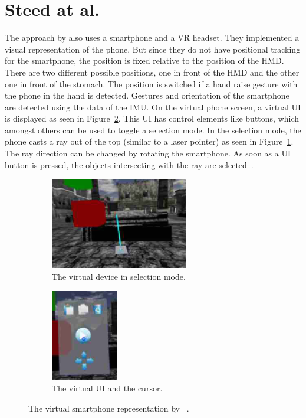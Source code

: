\section{Steed at al.}\label{section:steed-2013}
The approach by \citeauthor{Steed.2013} also uses a smartphone and a \ac{VR} headset. They implemented a visual representation of the phone. But since they do not have positional tracking for the smartphone, the position is fixed relative to the position of the \ac{HMD}. There are two different possible positions, one in front of the \ac{HMD} and the other one in front of the stomach. The position is switched if a hand raise gesture with the phone in the hand is detected. Gestures and orientation of the smartphone are detected using the data of the \ac{IMU}. On the virtual phone screen, a virtual \ac{UI} is displayed as seen in Figure~\ref{fig:steed-2013-ui}. This \ac{UI} has control elements like buttons, which amongst others can be used to toggle a selection mode. In the selection mode, the phone casts a ray out of the top (similar to a laser pointer) as seen in Figure~\ref{fig:steed-2013-laser-pointer}. The ray direction can be changed by rotating the smartphone. As soon as a \ac{UI} button is pressed, the objects intersecting with the ray are selected~\cite{Steed.2013}.

\begin{figure}[H]
  \centering
  \begin{subfigure}{0.45\textwidth}%
    \centering%
    \includegraphics[height=4cm]{figures/related_work/steed_2013_laser_pointer.png}
    \caption{The virtual device in selection mode.}\label{fig:steed-2013-laser-pointer}%
  \end{subfigure}%
  \hspace{0.1\textwidth}%
  \begin{subfigure}{0.45\textwidth}%
    \centering%
    \includegraphics[height=4cm]{figures/related_work/steed_2013_ui.png}
    \caption{The virtual \ac{UI} and the cursor.}\label{fig:steed-2013-ui}
  \end{subfigure}%
  \caption[Virtual smartphone representation by Steep et al.]{The virtual smartphone representation by \citeauthor{Steed.2013}~\protect\cite[43]{Steed.2013}.}\label{fig:steed-2013}
\end{figure}